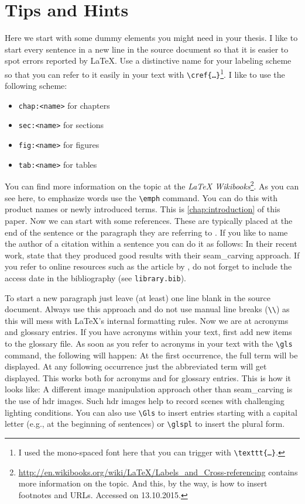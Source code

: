 \section{Tips and Hints}
Here we start with some dummy elements you might need in your thesis.
I like to start every sentence in a new line in the source document so that it is easier to spot errors reported by \LaTeX.
Use a distinctive name for your labeling scheme so that you can refer to it easily in your text with \texttt{\textbackslash{}cref\{\dots\}}\footnote{I used the mono\hyp{}spaced font here that you can trigger with \texttt{\textbackslash{}texttt\{\dots\}}.}.
I like to use the following scheme:
\begin{itemize}
	\item \texttt{chap:<name>} for chapters
	\item \texttt{sec:<name>} for sections
	\item \texttt{fig:<name>} for figures
	\item \texttt{tab:<name>} for tables
\end{itemize}
You can find more information on the topic at the \emph{LaTeX Wikibooks}\footnote{\url{http://en.wikibooks.org/wiki/LaTeX/Labels_and_Cross-referencing} contains more information on the topic. And this, by the way, is how to insert footnotes and URLs. Accessed on 13.10.2015.}.
As you can see here, to emphasize words use the \texttt{\textbackslash{}emph} command.
You can do this with product names or newly introduced terms.
This is \cref{chap:introduction} of this paper.
Now we can start with some references.
These are typically placed at the end of the sentence or the paragraph they are referring to \citep{Avidan2007,Elalfy2007}.
If you like to name the author of a citation within a sentence you can do it as follows:
In their recent work, \citet{Avidan2007} state that they produced good results with their \gls{seam_carving} approach.
If you refer to online resources such as the article by \citet{Fortune2015}, do not forget to include the access date in the bibliography (see \texttt{library.bib}).

To start a new paragraph just leave (at least) one line blank in the source document.
Always use this approach and do not use manual line breaks (\texttt{\textbackslash{}\textbackslash{}}) as this will mess with \LaTeX{}'s internal formatting rules.
Now we are at acronyms and glossary entries.
If you have acronyms within your text, first add new items to the glossary file.
As soon as you refer to acronyms in your text with the \texttt{\textbackslash{}gls} command, the following will happen:
At the first occurrence, the full term will be displayed.
At any following occurrence just the abbreviated term will get displayed.
This works both for acronyms and for glossary entries.
This is how it looks like:
A different image manipulation approach other than \gls{seam_carving} is the use of \gls{hdr} images.
Such \gls{hdr} images help to record scenes with challenging lighting conditions.
You can also use \texttt{\textbackslash{}Gls} to insert entries starting with a capital letter (e.g., at the beginning of sentences) or \texttt{\textbackslash{}glspl} to insert the plural form.

